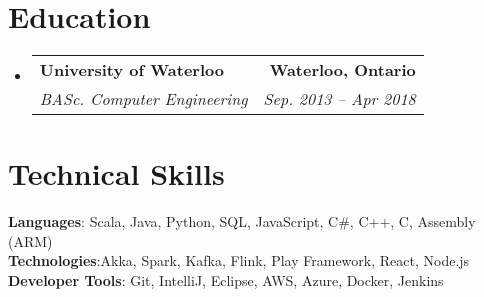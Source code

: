 \documentclass[letterpaper,11pt]{article}
\makeatletter
\newcommand{\resumeSubheading}[4]{
  \vspace{-3pt}\item
    \begin{tabular*}{0.97\textwidth}[t]{l@{\extracolsep{\fill}}r}
      \textbf{#1} & {\small \textbf{#2}} \\
      \textit{\fontsize{10}{11}\selectfont #3} & \textit{\fontsize{8}{10}\selectfont #4} \\  %
    \end{tabular*}\vspace{-1pt}
}
\newcommand{\resumeSubHeadingListStart}{\begin{itemize}[leftmargin=0.15in, label={}]}
\newcommand{\resumeSubHeadingListEnd}{\end{itemize}}
\makeatother
\begin{document}
\section{Education}
  \resumeSubHeadingListStart
    \resumeSubheading
      {University of Waterloo}{Waterloo, Ontario}
      {BASc. Computer Engineering}{Sep. 2013 -- Apr 2018}
  \resumeSubHeadingListEnd


%
\section{Technical Skills}
 \begin{itemize}[leftmargin=0.15in, label={}]
    \small{\item{
     \textbf{Languages}{: Scala, Java, Python, SQL, JavaScript, C\#, C++, C, Assembly (ARM)} \\
     \textbf{Technologies}{:Akka, Spark, Kafka, Flink, Play Framework, React, Node.js} \\
     \textbf{Developer Tools}{: Git, IntelliJ, Eclipse, AWS, Azure, Docker, Jenkins}
    }}
 \end{itemize}


\end{document}
